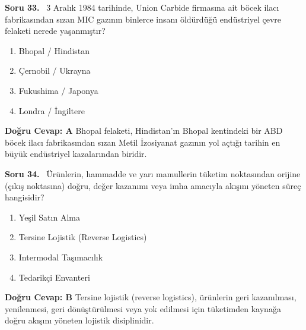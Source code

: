\documentclass[11pt,a4paper,openany]{book}
\begin{document}
\needspace{5cm}
\vspace{8pt}
\noindent\textbf{\large\sffamily Soru 33.} \ 3 Aralık 1984 tarihinde, Union Carbide firmasına ait böcek ilacı fabrikasından sızan MIC gazının binlerce insanı öldürdüğü endüstriyel çevre felaketi nerede yaşanmıştır?
\begin{enumerate}[label=\Alph*), leftmargin=25pt, topsep=4pt, itemsep=2pt]
    \item Bhopal / Hindistan
    \item Çernobil / Ukrayna
    \item Fukushima / Japonya
    \item Londra / İngiltere
\end{enumerate}
\vspace{4pt}
\begin{tcolorbox}[title=Cevap ve Açıklama, colback=gray!3!white, colframe=primarycolor!90!black, arc=2mm, fonttitle=\bfseries\sffamily, top=6pt, bottom=6pt]
    \textbf{Doğru Cevap: A}
    \vspace{2pt}
    Bhopal felaketi, Hindistan'ın Bhopal kentindeki bir ABD böcek ilacı fabrikasından sızan Metil İzosiyanat gazının yol açtığı tarihin en büyük endüstriyel kazalarından biridir.
\end{tcolorbox}
\vspace{10pt}

\needspace{5cm}
\vspace{8pt}
\noindent\textbf{\large\sffamily Soru 34.} \ Ürünlerin, hammadde ve yarı mamullerin tüketim noktasından orijine (çıkış noktasına) doğru, değer kazanımı veya imha amacıyla akışını yöneten süreç hangisidir?
\begin{enumerate}[label=\Alph*), leftmargin=25pt, topsep=4pt, itemsep=2pt]
    \item Yeşil Satın Alma
    \item Tersine Lojistik (Reverse Logistics)
    \item Intermodal Taşımacılık
    \item Tedarikçi Envanteri
\end{enumerate}
\vspace{4pt}
\begin{tcolorbox}[title=Cevap ve Açıklama, colback=gray!3!white, colframe=primarycolor!90!black, arc=2mm, fonttitle=\bfseries\sffamily, top=6pt, bottom=6pt]
    \textbf{Doğru Cevap: B}
    \vspace{2pt}
    Tersine lojistik (reverse logistics), ürünlerin geri kazanılması, yenilenmesi, geri dönüştürülmesi veya yok edilmesi için tüketimden kaynağa doğru akışını yöneten lojistik disiplinidir.
\end{tcolorbox}
\vspace{10pt}
\end{document}
